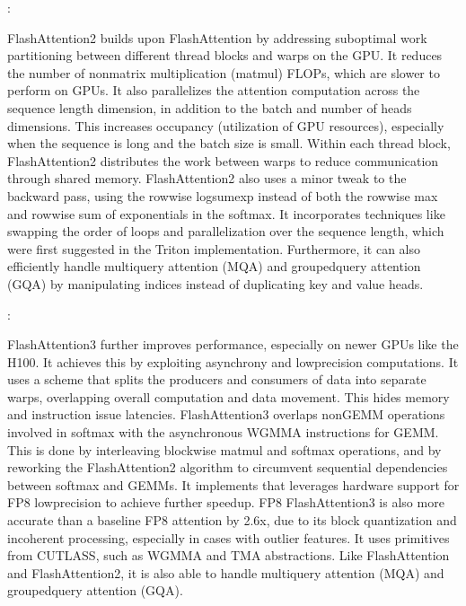 \documentclass[letterpaper,11pt,english]{sphinxmanual}
\begin{document}
\sphinxAtStartPar
{}:

\sphinxAtStartPar
FlashAttention\sphinxhyphen{}2  builds upon
FlashAttention by addressing suboptimal work partitioning between
different thread blocks and warps on the GPU. It reduces the number of
non\sphinxhyphen{}matrix multiplication (matmul) FLOPs, which are slower to perform on
GPUs. It also parallelizes the attention computation across the sequence
length dimension, in addition to the batch and number of heads
dimensions. This increases occupancy (utilization of GPU resources),
especially when the sequence is long and the batch size is small. Within
each thread block, FlashAttention\sphinxhyphen{}2 distributes the work between warps
to reduce communication through shared memory. FlashAttention\sphinxhyphen{}2 also
uses a minor tweak to the backward pass, using the row\sphinxhyphen{}wise logsumexp
instead of both the row\sphinxhyphen{}wise max and row\sphinxhyphen{}wise sum of exponentials in the
softmax. It incorporates techniques like swapping the order of loops and
parallelization over the sequence length, which were first suggested in
the Triton implementation. Furthermore, it can also efficiently handle
multi\sphinxhyphen{}query attention (MQA) and grouped\sphinxhyphen{}query attention (GQA) by
manipulating indices instead of duplicating key and value heads.

\sphinxAtStartPar
{}:

\sphinxAtStartPar
FlashAttention\sphinxhyphen{}3  further improves
performance, especially on newer GPUs like the H100. It achieves this by
exploiting asynchrony and low\sphinxhyphen{}precision computations. It uses a
 scheme that splits the
producers and consumers of data into separate warps, overlapping overall
computation and data movement. This hides memory and instruction issue
latencies. FlashAttention\sphinxhyphen{}3 overlaps non\sphinxhyphen{}GEMM operations involved in
softmax with the asynchronous WGMMA instructions for GEMM. This is done
by interleaving block\sphinxhyphen{}wise matmul and softmax operations, and by
reworking the FlashAttention\sphinxhyphen{}2 algorithm to circumvent sequential
dependencies between softmax and GEMMs. It implements  that leverages hardware support
for FP8 low\sphinxhyphen{}precision to achieve further speedup. FP8 FlashAttention\sphinxhyphen{}3
is also more accurate than a baseline FP8 attention by 2.6x, due to its
block quantization and incoherent processing, especially in cases with
outlier features. It uses primitives from CUTLASS, such as WGMMA and TMA
abstractions. Like FlashAttention and FlashAttention\sphinxhyphen{}2, it is also able
to handle multi\sphinxhyphen{}query attention (MQA) and grouped\sphinxhyphen{}query attention (GQA).
\end{document}
